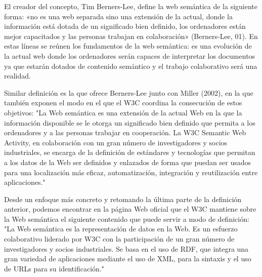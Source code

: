 El creador del concepto, Tim Berners-Lee, define la web semántica de la siguiente forma: «no es una web separada sino una extensión de la actual, donde la información está dotada de un significado bien definido, los ordenadores están mejor capacitados y las personas trabajan en colaboración» (Berners-Lee, 01). En estas líneas se reúnen los fundamentos de la web semántica: es una evolución de la actual web donde los ordenadores serán capaces de interpretar los documentos ya que estarán dotados de contenido semántico y el trabajo colaborativo será una realidad.


Similar definición es la que ofrece Berners-Lee junto con Miller (2002), en la que también exponen el modo en el que el W3C coordina la consecución de estos objetivos: "La Web semántica es una extensión de la actual Web en la que la información disponible se le otorga un significado bien definido que permita a los ordenadores y a las personas trabajar en cooperación. La W3C Semantic Web Activity, en colaboración con un gran número de investigadores y socios industriales, se encarga de la definición de estándares y tecnologías que permitan a los datos de la Web ser definidos y enlazados de forma que puedan ser usados para una localización más eficaz, automatización, integración y reutilización entre aplicaciones."


Desde un enfoque más concreto y retomando la última parte de la definición anterior, podemos encontrar en la página Web oficial que el W3C mantiene sobre la Web semántica el siguiente contenido que puede servir a modo de definición: "La Web semántica es la representación de datos en la Web. Es un esfuerzo colaborativo liderado por W3C con la participación de un gran número de investigadores y socios industriales. Se basa en el uso de RDF, que integra una gran variedad de aplicaciones mediante el uso de XML, para la sintaxis y el uso de URLs para su identificación." 


